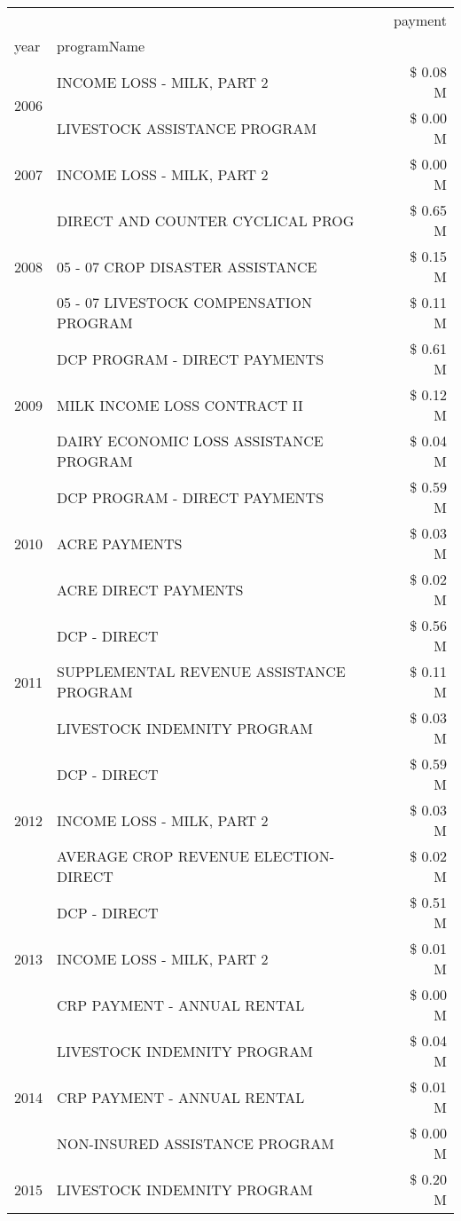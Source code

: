 \begin{tabular}{llr}
\toprule
 &  & payment \\
year & programName &  \\
\midrule
\multirow[t]{2}{*}{2006} & INCOME LOSS - MILK, PART 2 & \$ 0.08 M \\
 & LIVESTOCK ASSISTANCE PROGRAM & \$ 0.00 M \\
\cline{1-3}
2007 & INCOME LOSS - MILK, PART 2 & \$ 0.00 M \\
\cline{1-3}
\multirow[t]{3}{*}{2008} & DIRECT AND COUNTER CYCLICAL PROG & \$ 0.65 M \\
 & 05 - 07 CROP DISASTER ASSISTANCE & \$ 0.15 M \\
 & 05 - 07 LIVESTOCK COMPENSATION PROGRAM & \$ 0.11 M \\
\cline{1-3}
\multirow[t]{3}{*}{2009} & DCP PROGRAM - DIRECT PAYMENTS & \$ 0.61 M \\
 & MILK INCOME LOSS CONTRACT II & \$ 0.12 M \\
 & DAIRY ECONOMIC LOSS ASSISTANCE PROGRAM & \$ 0.04 M \\
\cline{1-3}
\multirow[t]{3}{*}{2010} & DCP PROGRAM - DIRECT PAYMENTS & \$ 0.59 M \\
 & ACRE PAYMENTS & \$ 0.03 M \\
 & ACRE DIRECT PAYMENTS & \$ 0.02 M \\
\cline{1-3}
\multirow[t]{3}{*}{2011} & DCP - DIRECT & \$ 0.56 M \\
 & SUPPLEMENTAL REVENUE ASSISTANCE PROGRAM & \$ 0.11 M \\
 & LIVESTOCK INDEMNITY PROGRAM & \$ 0.03 M \\
\cline{1-3}
\multirow[t]{3}{*}{2012} & DCP - DIRECT & \$ 0.59 M \\
 & INCOME LOSS - MILK, PART 2 & \$ 0.03 M \\
 & AVERAGE CROP REVENUE ELECTION-DIRECT & \$ 0.02 M \\
\cline{1-3}
\multirow[t]{3}{*}{2013} & DCP - DIRECT & \$ 0.51 M \\
 & INCOME LOSS - MILK, PART 2 & \$ 0.01 M \\
 & CRP PAYMENT - ANNUAL RENTAL & \$ 0.00 M \\
\cline{1-3}
\multirow[t]{3}{*}{2014} & LIVESTOCK INDEMNITY PROGRAM & \$ 0.04 M \\
 & CRP PAYMENT - ANNUAL RENTAL & \$ 0.01 M \\
 & NON-INSURED ASSISTANCE PROGRAM & \$ 0.00 M \\
\cline{1-3}
\multirow[t]{3}{*}{2015} & LIVESTOCK INDEMNITY PROGRAM & \$ 0.20 M \\

\end{tabular}
